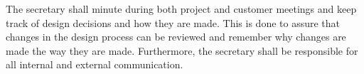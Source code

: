 	The secretary shall minute during both project and customer meetings and keep track of design decisions and how they are made. This is done to assure that changes in the design process can be reviewed and remember why changes are made the way they are made. Furthermore, the secretary shall be responsible for all internal and external communication.